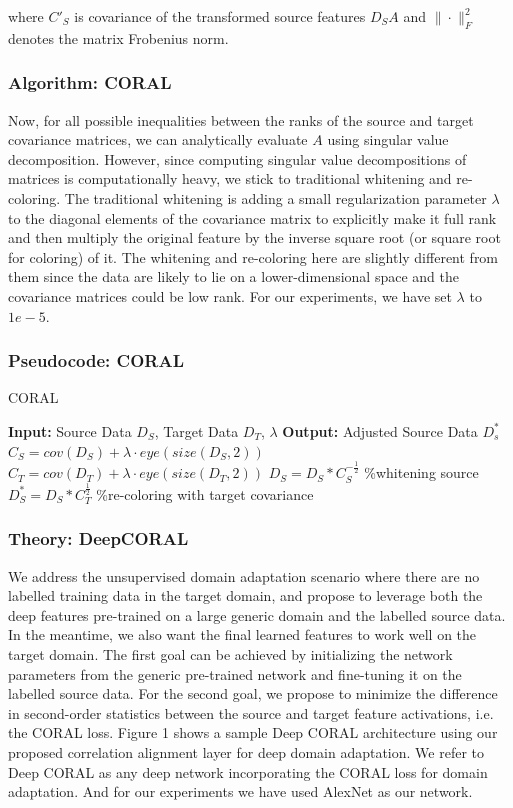 \documentclass{article}
\begin{document}
where $C'_S$ is covariance of the transformed source features $D_S A$ and $\|\cdot\|_F^2$ denotes the matrix Frobenius norm.

\subsubsection{Algorithm: CORAL}
Now, for all possible inequalities between the ranks of the source and target covariance matrices, we can analytically evaluate $A$ using singular value decomposition\cite{Coral}. However, since computing singular value decompositions of matrices is computationally heavy, we stick to traditional whitening and re-coloring.
The traditional whitening is adding a small regularization parameter $\lambda$ to the diagonal elements of the covariance matrix to explicitly make it full rank and then multiply the original feature by the inverse square root (or square root for coloring) of it. The whitening and re-coloring here are slightly different from them since the data are likely to lie on a lower-dimensional space and the covariance matrices could be low rank. For our experiments, we have set $\lambda$ to $1e-5$.

\subsubsection{Pseudocode: CORAL}

\begin{algorithm}[H]
\caption{CORAL}
\begin{algorithmic}[1]
\STATE \textbf{Input:} Source Data $D_S$, Target Data $D_T$, $\lambda$
\STATE \textbf{Output:} Adjusted Source Data $D_s^*$
\STATE $C_S = cov(D_S) + \lambda\cdot eye(size(D_S, 2))$
\STATE $C_T = cov(D_T) + \lambda\cdot eye(size(D_T, 2))$
\STATE $D_S = D_S * C_S^{-\frac{1}{2}}$        \%whitening source
\STATE $D_S^* = D_S*C_T^{\frac{1}{2}}$         \%re-coloring with target covariance
\end{algorithmic}
\end{algorithm}

\subsubsection{Theory: DeepCORAL}
We address the unsupervised domain adaptation scenario where there are no
labelled training data in the target domain, and propose to leverage both the
deep features pre-trained on a large generic domain
and the labelled source data. In the meantime, we also want the final learned
features to work well on the target domain. The first goal can be achieved by
initializing the network parameters from the generic pre-trained network and
fine-tuning it on the labelled source data. For the second goal, we propose to
minimize the difference in second-order statistics between the source and target
feature activations, i.e. the CORAL loss. Figure 1 shows a sample Deep CORAL
architecture using our proposed correlation alignment layer for deep domain
adaptation. We refer to Deep CORAL as any deep network incorporating the
CORAL loss for domain adaptation. And for our experiments we have used AlexNet as our network.
\end{document}
